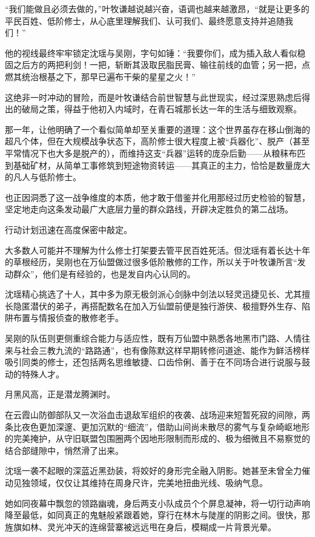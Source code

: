 “我们能做且必须去做的，”叶牧谦越说越兴奋，语调也越来越激昂，“就是让更多的平民百姓、低阶修士，从心底里理解我们、认可我们、最终愿意支持并追随我们！”

他的视线最终牢牢锁定沈瑶与吴刚，字句如锤：“我要你们，成为插入敌人看似稳固之后方的两把利剑！一把，斩断其汲取民脂民膏、输往前线的血管；另一把，点燃其统治根基之下，那早已遍布干柴的星星之火！”

这绝非一时冲动的冒险，而是叶牧谦结合前世智慧与此世现实，经过深思熟虑后得出的破局之策，得益于他初入内域时，在青石城那长达一年的生活与细致观察。

那一年，让他明确了一个看似简单却至关重要的道理：这个世界虽存在移山倒海的超凡个体，但在大规模战争状态下，高阶修士很大程度上被“兵器化”、脱产（甚至平常情况下也大多是脱产的），而维持这支“兵器”运转的庞杂后勤——从粮秣布匹到基础矿材，从简单工事修筑到短途物资转运——其真正的主力，恰恰是数量庞大的凡人与低阶修士。

也正因洞悉了这一战争维度的本质，他才敢于借鉴并化用那经过历史检验的智慧，坚定地走向这条发动最广大底层力量的群众路线，开辟决定胜负的第二战场。

行动计划迅速在高度保密中敲定。

大多数人可能并不理解为什么修士打架要去管平民百姓死活。但沈瑶有着长达十年的草根经历，吴刚也在万仙盟做过很多低阶散修的工作，所以关于叶牧谦所言“发动群众”，他们是有经验的，也是发自内心认同的。

沈瑶精心挑选了十人，其中多为原无极剑派心剑脉中剑法以轻灵迅捷见长、尤其擅长隐匿潜伏的弟子，再搭配数名在加入万仙盟前便是独行游侠、极擅野外生存、陷阱布置与情报侦查的散修老手。

吴刚的队伍则更侧重综合能力与适应性，既有万仙盟中熟悉各地黑市门路、人情往来与社会三教九流的“路路通”，也有像陈默这样早期转修问道途、能作为鲜活榜样吸引同类的修士，还包括两名思维敏捷、口齿伶俐、善于在不同场合进行说服与鼓动的特殊人才。

月黑风高，正是潜龙腾渊时。

在云霞山防御部队又一次浴血击退敌军组织的夜袭、战场迎来短暂死寂的间隙，两条比夜色更加深邃、更加沉默的“细流”，借助山间尚未散尽的雾气与复杂崎岖地形的完美掩护，从守旧联盟包围圈两个因地形限制而形成的、极为细微且不易察觉的结合部缝隙中，悄然滑了出来。

沈瑶一袭不起眼的深蓝近黑劲装，将姣好的身形完全融入阴影。她甚至未曾全力催动见独领域，仅仅让其维持在周身尺许，完美地扭曲光线、吸纳气息。

她如同夜幕中飘忽的领路幽魂，身后两支小队成员个个屏息凝神，将一切行动声响降至最低，如同真正的鬼魅般紧跟着她，穿行在林木与陡崖的阴影之间。很快，那旌旗如林、灵光冲天的连绵营寨被远远甩在身后，模糊成一片背景光晕。

